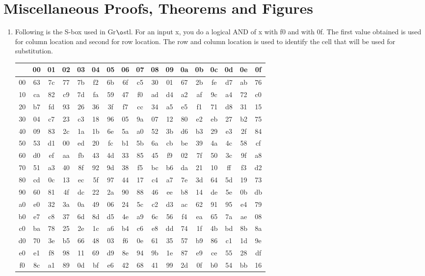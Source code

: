 \chapter{Miscellaneous Proofs, Theorems and Figures}

\begin{enumerate}
  \item Following is the S-box used in Gr$\o$stl. For an input x, you do a logical AND of x with 
  f0 and with 0f. The first value obtained is used for column location and second for row location.
  The row and column location is used to identify the cell that will be used for substitution.
  \begin{table}[h]
  \begin{center}
    \begin{tabular}{ c |  *{16}{c}}
       & 00 & 01 & 02 & 03 & 04 & 05 & 06 & 07 & 08 & 09 & 0a & 0b & 0c & 0d & 0e & 0f \\ \hline
    00 & 63 & 7c & 77 & 7b & f2 & 6b & 6f & c5 & 30 & 01 & 67 & 2b & fe & d7 & ab & 76 \\ 
    10 & ca & 82 & c9 & 7d & fa & 59 & 47 & f0 & ad & d4 & a2 & af & 9c & a4 & 72 & c0 \\
    20 & b7 & fd & 93 & 26 & 36 & 3f & f7 & cc & 34 & a5 & e5 & f1 & 71 & d8 & 31 & 15 \\
    30 & 04 & c7 & 23 & c3 & 18 & 96 & 05 & 9a & 07 & 12 & 80 & e2 & eb & 27 & b2 & 75 \\
    40 & 09 & 83 & 2c & 1a & 1b & 6e & 5a & a0 & 52 & 3b & d6 & b3 & 29 & e3 & 2f & 84 \\
    50 & 53 & d1 & 00 & ed & 20 & fc & b1 & 5b & 6a & cb & be & 39 & 4a & 4c & 58 & cf \\
    60 & d0 & ef & aa & fb & 43 & 4d & 33 & 85 & 45 & f9 & 02 & 7f & 50 & 3c & 9f & a8 \\
    70 & 51 & a3 & 40 & 8f & 92 & 9d & 38 & f5 & bc & b6 & da & 21 & 10 & ff & f3 & d2 \\
    80 & cd & 0c & 13 & ec & 5f & 97 & 44 & 17 & c4 & a7 & 7e & 3d & 64 & 5d & 19 & 73 \\
    90 & 60 & 81 & 4f & dc & 22 & 2a & 90 & 88 & 46 & ee & b8 & 14 & de & 5e & 0b & db \\
    a0 & e0 & 32 & 3a & 0a & 49 & 06 & 24 & 5c & c2 & d3 & ac & 62 & 91 & 95 & e4 & 79 \\
    b0 & e7 & c8 & 37 & 6d & 8d & d5 & 4e & a9 & 6c & 56 & f4 & ea & 65 & 7a & ae & 08 \\
    c0 & ba & 78 & 25 & 2e & 1c & a6 & b4 & c6 & e8 & dd & 74 & 1f & 4b & bd & 8b & 8a \\
    d0 & 70 & 3e & b5 & 66 & 48 & 03 & f6 & 0e & 61 & 35 & 57 & b9 & 86 & c1 & 1d & 9e \\
    e0 & e1 & f8 & 98 & 11 & 69 & d9 & 8e & 94 & 9b & 1e & 87 & e9 & ce & 55 & 28 & df \\
    f0 & 8c & a1 & 89 & 0d & bf & e6 & 42 & 68 & 41 & 99 & 2d & 0f & b0 & 54 & bb & 16 \\
    \end{tabular}
  \end{center}
  \end{table}


\end{enumerate}
